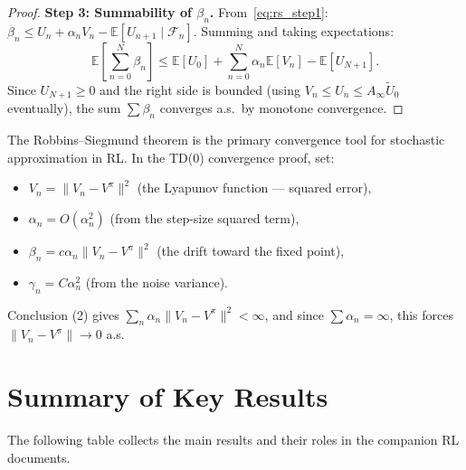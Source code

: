 \documentclass[11pt,a4paper]{article}
\theoremstyle{definition}
\theoremstyle{plain}
\theoremstyle{remark}
\newcommand{\E}{\mathbb{E}}
\begin{document}
\begin{proof}
\textbf{Step 3: Summability of $\beta_n$.}
From~\eqref{eq:rs_step1}: $\beta_n \leq U_n + \alpha_n V_n - \E[U_{n+1} \mid \mathcal{F}_n]$. Summing and taking expectations:
\begin{equation}
    \E\!\left[\sum_{n=0}^N \beta_n\right] \leq \E[U_0] + \sum_{n=0}^N \alpha_n \E[V_n] - \E[U_{N+1}].
\end{equation}
Since $U_{N+1} \geq 0$ and the right side is bounded (using $V_n \leq U_n \leq A_\infty \tilde{U}_0$ eventually), the sum $\sum \beta_n$ converges a.s.\ by monotone convergence.
\end{proof}

\begin{rlconnection}[Connection to RL]
The Robbins--Siegmund theorem is the primary convergence tool for stochastic approximation in RL. In the TD(0) convergence proof, set:
\begin{itemize}[nosep]
    \item $V_n = \|V_n - V^\pi\|^2$ (the Lyapunov function --- squared error),
    \item $\alpha_n = O(\alpha_n^2)$ (from the step-size squared term),
    \item $\beta_n = c \alpha_n \|V_n - V^\pi\|^2$ (the drift toward the fixed point),
    \item $\gamma_n = C \alpha_n^2$ (from the noise variance).
\end{itemize}
Conclusion (2) gives $\sum_n \alpha_n \|V_n - V^\pi\|^2 < \infty$, and since $\sum \alpha_n = \infty$, this forces $\|V_n - V^\pi\| \to 0$ a.s.
\end{rlconnection}

\section{Summary of Key Results}
\label{sec:summary}

The following table collects the main results and their roles in the companion RL documents.
\end{document}
